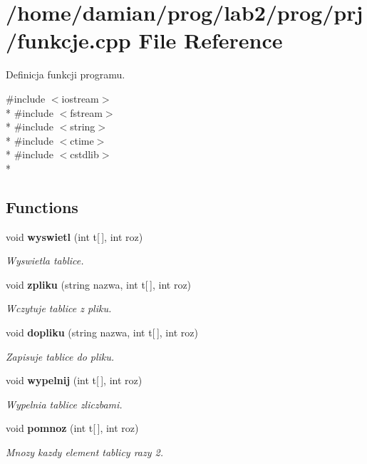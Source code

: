 \section{/home/damian/prog/lab2/prog/prj/funkcje.cpp File Reference}
\label{funkcje_8cpp}


Definicja funkcji programu.  


{\ttfamily \#include $<$iostream$>$}\\*
{\ttfamily \#include $<$fstream$>$}\\*
{\ttfamily \#include $<$string$>$}\\*
{\ttfamily \#include $<$ctime$>$}\\*
{\ttfamily \#include $<$cstdlib$>$}\\*
\subsection*{Functions}
\begin{DoxyCompactItemize}
\item 
void {\bf wyswietl} (int t[$\,$], int roz)
\begin{DoxyCompactList}\small\item\em Wyswietla tablice. \end{DoxyCompactList}\item 
void {\bf zpliku} (string nazwa, int t[$\,$], int roz)
\begin{DoxyCompactList}\small\item\em Wczytuje tablice z pliku. \end{DoxyCompactList}\item 
void {\bf dopliku} (string nazwa, int t[$\,$], int roz)
\begin{DoxyCompactList}\small\item\em Zapisuje tablice do pliku. \end{DoxyCompactList}\item 
void {\bf wypelnij} (int t[$\,$], int roz)
\begin{DoxyCompactList}\small\item\em Wypelnia tablice zliczbami. \end{DoxyCompactList}\item 
void {\bf pomnoz} (int t[$\,$], int roz)
\begin{DoxyCompactList}\small\item\em Mnozy kazdy element tablicy razy 2. \end{DoxyCompactList}\end{DoxyCompactItemize}


